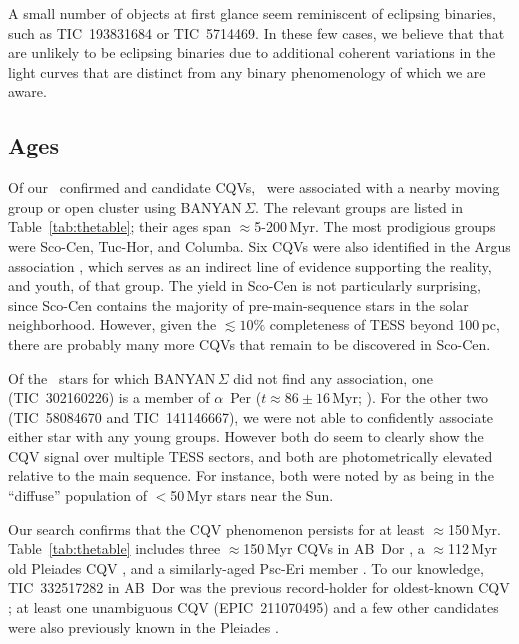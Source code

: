 \documentclass[11pt,twocolumn,tighten]{aastex63}
\begin{document}
A small number of objects at first glance seem reminiscent of
eclipsing binaries, such as TIC~193831684 or TIC~5714469.  In these
few cases, we believe that that are unlikely to be eclipsing binaries
due to additional coherent variations in the light curves that are
distinct from any binary phenomenology of which we are aware.


\subsection{Ages}

Of our \ncpvsfound\ confirmed and candidate CQVs, \nnotfieldbanyan\
were associated with a nearby moving group or open cluster using
BANYAN\,$\Sigma$.  The relevant groups are listed in
Table~\ref{tab:thetable}; their ages span $\approx$5-200\,Myr.  The
most prodigious groups were Sco-Cen, Tuc-Hor, and Columba.  Six CQVs
were also identified in the Argus association
\citep{2019ApJ...870...27Z}, which serves as an indirect line of
evidence supporting the reality, and youth, of that group.  The yield
in Sco-Cen is not particularly surprising, since Sco-Cen contains the
majority of pre-main-sequence stars in the solar neighborhood.
However, given the $\lesssim$$10\%$ completeness of TESS beyond
100\,pc, there are probably many more CQVs that remain to be
discovered in Sco-Cen.  

Of the \ngoodsfieldbanyan\ stars for which BANYAN\,$\Sigma$ did not
find any association, one (TIC~302160226) is a member of $\alpha$~Per
($t\approx 86\pm16$\,Myr;
\citealt{2021A&A...645A..84M,2023AJ....166...14B}).  For the other two
(TIC~58084670 and TIC~141146667), we were not able to confidently
associate either star with any young groups.  However both do seem to
clearly show the CQV signal over multiple TESS sectors, and both are
photometrically elevated relative to the main sequence.  For instance,
both were noted by \citet{2021ApJ...917...23K} as being in the ``diffuse'' population
of $<$50\,Myr stars near the Sun.  

Our search confirms that the CQV phenomenon persists for at least
$\approx$150\,Myr.  Table~\ref{tab:thetable} includes three $\approx$150\,Myr CQVs
in AB~Dor \citep{2015MNRAS.454..593B}, a $\approx$112\,Myr old Pleiades CQV
\citep{2015ApJ...813..108D}, and
a similarly-aged Psc-Eri member \citep{2020A&A...639A..64R}.  To our knowledge, TIC~332517282
in AB~Dor was the previous record-holder for oldest-known CQV
\citep{2019ApJ...876..127Z,2022AJ....163..144G}; at least one
unambiguous CQV (EPIC~211070495) and a few other candidates were also
previously known in the Pleiades \citep{2016AJ....152..114R}.  
\end{document}
